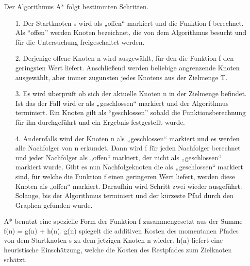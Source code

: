 Der Algorithmus A* folgt bestimmten Schritten. 
\begin{itemize}
\item[1.] Der Startknoten s wird als „offen“ markiert und die Funktion f berechnet. Als “offen” werden Knoten bezeichnet, die von dem Algorithmus besucht und für die Untersuchung freigeschaltet werden.
\item[2.] Derjenige offene Knoten n wird ausgewählt, für den die Funktion f den geringsten Wert liefert. Anschließend werden beliebige angrenzende Knoten ausgewählt, aber immer zugunsten jedes Knotens aus der Zielmenge T.
\item[3.] Es wird überprüft ob sich der aktuelle Knoten n in der Zielmenge befindet. Ist das der Fall wird er als „geschlossen“ markiert und der Algorithmus terminiert. Ein Knoten gilt als “geschlossen” sobald die Funktionsberechnung für ihn durchgeführt und ein Ergebnis festgestellt wurde. 
\item[4.] Andernfalls wird der Knoten n als „geschlossen“ markiert und es werden alle Nachfolger von n erkundet. Dann wird f für jeden Nachfolger berechnet und jeder Nachfolger als „offen“ markiert, der nicht als „geschlossen“ markiert wurde. Gibt es nun Nachfolgeknoten die als „geschlossen“ markiert sind, für welche die Funktion f einen geringeren Wert liefert, werden diese Knoten als „offen“ markiert. Daraufhin wird Schritt zwei wieder ausgeführt. Solange, bis der Algorithmus terminiert und der kürzeste Pfad durch den Graphen gefunden wurde\cite{HartNilssonandRaphael.1968}.
\end{itemize}


A* benutzt eine spezielle Form der Funktion f zusammengesetzt aus der Summe f(n) = g(n) + h(n). g(n) spiegelt die additiven Kosten des momentanen Pfades von dem Startknoten s zu dem jetzigen Knoten n wieder. h(n) liefert eine heuristische Einschätzung, welche die Kosten des Restpfades zum Zielknoten schätzt\cite{RinaDechterandJudeaPearl.1983}.